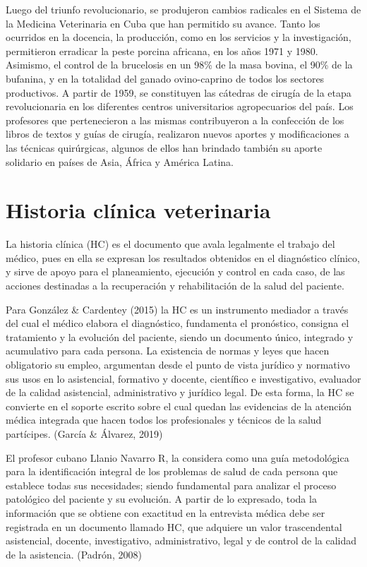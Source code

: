 Luego del triunfo revolucionario, se produjeron cambios radicales en el Sistema de la Medicina Veterinaria en Cuba que han permitido su avance. Tanto los ocurridos en la docencia, la producción, como en los servicios y la investigación, permitieron erradicar la peste porcina africana, en los años 1971 y 1980. Asimismo, el control de la brucelosis en un 98\% de la masa bovina, el 90\% de la bufanina, y en la totalidad del ganado ovino-caprino de todos los sectores productivos.  A partir de 1959, se constituyen las cátedras de cirugía  de la etapa revolucionaria en los diferentes centros universitarios agropecuarios del país. Los profesores que pertenecieron a las mismas contribuyeron a la confección de los libros de textos y guías de cirugía, realizaron nuevos aportes y modificaciones a las técnicas quirúrgicas, algunos de ellos han brindado también su aporte solidario en países de Asia, África y América Latina. 

\section{Historia clínica veterinaria}
La historia clínica (HC) es el documento que avala legalmente el trabajo del médico, pues en ella se expresan los resultados obtenidos en el diagnóstico clínico, y sirve de apoyo para el planeamiento, ejecución y control en cada caso, de las acciones destinadas a la recuperación y rehabilitación de la salud del paciente.  

Para González \& Cardentey (2015) la HC es un instrumento mediador a través del cual el médico elabora el diagnóstico, fundamenta el pronóstico, consigna el tratamiento y la evolución del paciente, siendo un documento único, integrado y acumulativo para cada persona. La existencia de normas y leyes que hacen obligatorio su empleo, argumentan desde el punto de vista jurídico y normativo sus usos en lo asistencial, formativo y docente, científico e investigativo, evaluador de la calidad asistencial, administrativo y jurídico legal. De esta forma, la HC se convierte en el soporte escrito sobre el cual quedan las evidencias de la atención médica integrada que hacen todos los profesionales y técnicos de la salud partícipes. (García \& Álvarez, 2019) 

El profesor cubano Llanio Navarro R, la considera como una guía metodológica para la identificación integral de los problemas de salud de cada persona que establece todas sus necesidades; siendo fundamental para analizar el proceso patológico del paciente y su evolución. A partir de lo expresado, toda la información que se obtiene con exactitud en la entrevista médica debe ser registrada en un documento llamado HC, que adquiere un valor trascendental asistencial, docente, investigativo, administrativo, legal y de control de la calidad de la asistencia. (Padrón, 2008)  

